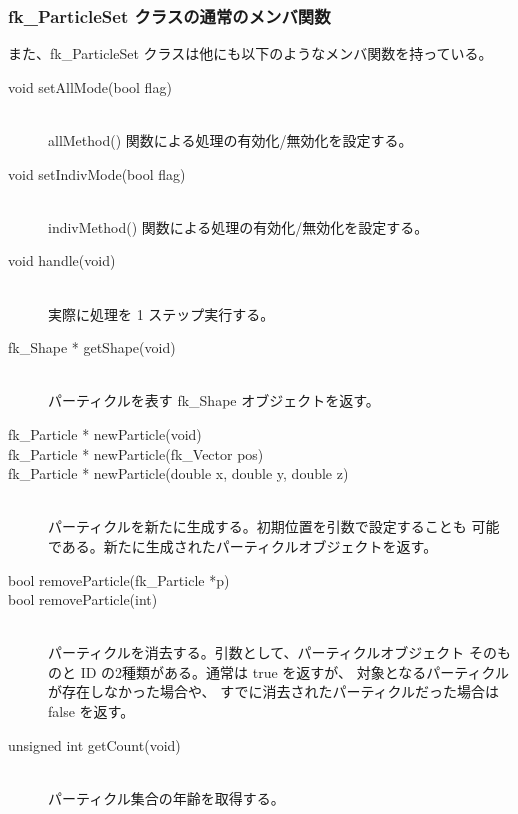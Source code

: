 \subsubsection{fk\_ParticleSet クラスの通常のメンバ関数}
また、fk\_ParticleSet クラスは他にも以下のようなメンバ関数を持っている。
\begin{description}
\item[void setAllMode(bool flag)] ~ \\
	allMethod() 関数による処理の有効化/無効化を設定する。\\

\item[void setIndivMode(bool flag)] ~ \\
	indivMethod() 関数による処理の有効化/無効化を設定する。\\

\item[void handle(void)] ~ \\
	実際に処理を 1 ステップ実行する。\\

\item[fk\_Shape * getShape(void)] ~ \\
	パーティクルを表す fk\_Shape オブジェクトを返す。\\

\item[fk\_Particle * newParticle(void)]
\item[fk\_Particle * newParticle(fk\_Vector pos)]
\item[fk\_Particle * newParticle(double x, double y, double z)] ~ \\
	パーティクルを新たに生成する。初期位置を引数で設定することも
	可能である。新たに生成されたパーティクルオブジェクトを返す。\\

\item[bool removeParticle(fk\_Particle *p)]
\item[bool removeParticle(int)] ~ \\
	パーティクルを消去する。引数として、パーティクルオブジェクト
	そのものと ID の2種類がある。通常は true を返すが、
	対象となるパーティクルが存在しなかった場合や、
	すでに消去されたパーティクルだった場合は false を返す。\\

\item[unsigned int getCount(void)] ~ \\
	パーティクル集合の年齢を取得する。\\


\end{description}
